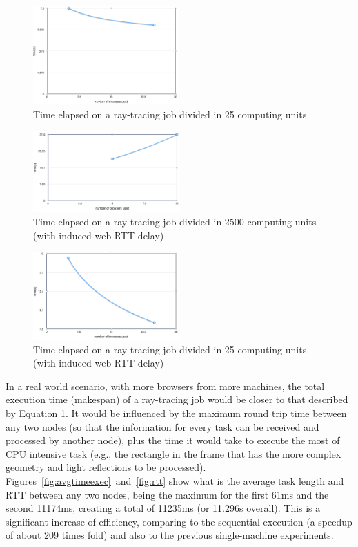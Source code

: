 \begin{figure}[]
  \centering
  \includegraphics[width=0.5\textwidth]{figs/2.png}
  \caption{Time elapsed on a ray-tracing job divided in 25 computing units}
  \label{fig:ray25}
\end{figure}

\begin{figure}[]
  \centering
  \includegraphics[width=0.5\textwidth]{figs/3.png}
  \caption{Time elapsed on a ray-tracing job divided in 2500 computing units (with induced web RTT delay)}
  \label{fig:ray2500time}
\end{figure}

\begin{figure}[]
  \centering
  \includegraphics[width=0.5\textwidth]{figs/4.png}
  \caption{Time elapsed on a ray-tracing job divided in 25 computing units (with induced web RTT delay)}
  \label{fig:ray25time}
\end{figure}

In a real world scenario, with more browsers from more machines, the total execution time (makespan) of a ray-tracing job would be closer to that described by Equation 1. It would be influenced by the maximum round trip time between any two nodes (so that the information for every task can be received and processed by another node), plus the time it would take to execute the most of CPU intensive task (e.g., the rectangle in the frame that has the more complex geometry and light reflections to be processed). Figures~\ref{fig:avgtimeexec}~and~\ref{fig:rtt} show what is the average task length and RTT between any two nodes, being the maximum for the first 61ms and the second 11174ms, creating a total of 11235ms (or 11.296s overall). This is a significant increase of efficiency, comparing to the sequential execution (a speedup of about 209 times fold) and also to the previous single-machine experiments.

